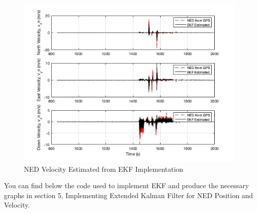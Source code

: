\begin{figure}[H]
  \centering
\includegraphics[width=0.8\linewidth, height=0.7\linewidth]{EKF/EKF_Vel.jpg}  
\caption{NED Velocity Estimated from EKF Implementation}
\label{fig:EKFVel}
\end{figure}

You can find below the code used to implement EKF and produce the necessary graphs in section 5, Implementing Extended Kalman Filter for NED Position and Velocity.
\label{EKF Estimated NED Matlab Code}

